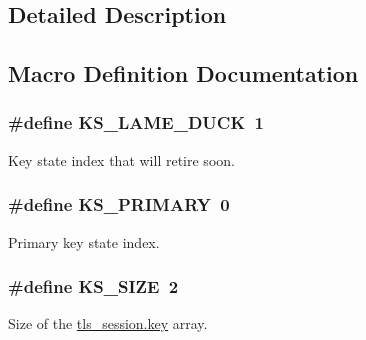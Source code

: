\subsection{Detailed Description}


\subsection{Macro Definition Documentation}
\hypertarget{group__control__processor_gadf097bad90fb34433800b15445db8398}{}
\subsubsection[{K\+S\+\_\+\+L\+A\+M\+E\+\_\+\+D\+U\+C\+K}]{\setlength{\rightskip}{0pt plus 5cm}\#define K\+S\+\_\+\+L\+A\+M\+E\+\_\+\+D\+U\+C\+K~1}\label{group__control__processor_gadf097bad90fb34433800b15445db8398}
Key state index that will retire soon. \hypertarget{group__control__processor_ga53a47713d8d3afdedf8826560da3e8b1}{}
\subsubsection[{K\+S\+\_\+\+P\+R\+I\+M\+A\+R\+Y}]{\setlength{\rightskip}{0pt plus 5cm}\#define K\+S\+\_\+\+P\+R\+I\+M\+A\+R\+Y~0}\label{group__control__processor_ga53a47713d8d3afdedf8826560da3e8b1}
Primary key state index. \hypertarget{group__control__processor_ga136f3095237ae23358c30581753e4178}{}
\subsubsection[{K\+S\+\_\+\+S\+I\+Z\+E}]{\setlength{\rightskip}{0pt plus 5cm}\#define K\+S\+\_\+\+S\+I\+Z\+E~2}\label{group__control__processor_ga136f3095237ae23358c30581753e4178}
Size of the {\ttfamily \hyperlink{structtls__session_a1de4672c1233dd4887122a909b10c314}{tls\+\_\+session.\+key}} array. \hypertarget{group__control__processor_ga0b9dd6c70b47159cdbfbeecb4b971197}{}
